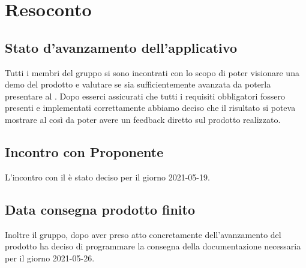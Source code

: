 \section{Resoconto}

\subsection{Stato d'avanzamento dell'applicativo}
Tutti i membri del gruppo si sono incontrati con lo scopo di poter visionare una demo del prodotto e valutare se sia sufficientemente avanzata da poterla presentare al \proponProg. 
Dopo esserci assicurati che tutti i requisiti obbligatori fossero presenti e implementati correttamente abbiamo deciso che il risultato si poteva mostrare al \proponProg{} così da poter avere un feedback diretto sul prodotto realizzato.\\
\subsection{Incontro con Proponente}
L'incontro con il \proponProg{}  è stato deciso per il giorno 2021-05-19.\\
\subsection{Data consegna prodotto finito}
Inoltre il gruppo, dopo aver preso atto concretamente dell'avanzamento del prodotto ha deciso di programmare la consegna della documentazione necessaria per il giorno 2021-05-26.